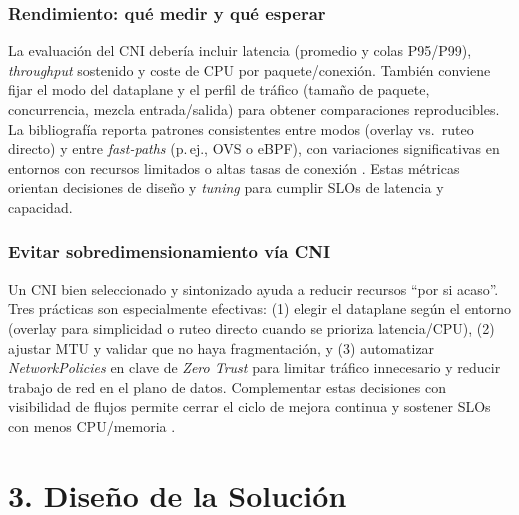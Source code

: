 \documentclass[journal]{IEEEtran}
\begin{document}
\subsubsection{Rendimiento: qué medir y qué esperar}
La evaluación del CNI debería incluir latencia (promedio y colas P95/P99), \emph{throughput} sostenido y coste de CPU por paquete/conexión. También conviene fijar el modo del dataplane y el perfil de tráfico (tamaño de paquete, concurrencia, mezcla entrada/salida) para obtener comparaciones reproducibles. La bibliografía reporta patrones consistentes entre modos (overlay vs.\ ruteo directo) y entre \emph{fast-paths} (p.\,ej., OVS o eBPF), con variaciones significativas en entornos con recursos limitados o altas tasas de conexión \cite{ref7,ref8,ref9,ref11,ref22,ref27}. Estas métricas orientan decisiones de diseño y \emph{tuning} para cumplir SLOs de latencia y capacidad.

\subsubsection{Evitar sobredimensionamiento vía CNI}
Un CNI bien seleccionado y sintonizado ayuda a reducir recursos “por si acaso”. Tres prácticas son especialmente efectivas: (1) elegir el dataplane según el entorno (overlay para simplicidad o ruteo directo cuando se prioriza latencia/CPU), (2) ajustar MTU y validar que no haya fragmentación, y (3) automatizar \emph{NetworkPolicies} en clave de \emph{Zero Trust} para limitar tráfico innecesario y reducir trabajo de red en el plano de datos. Complementar estas decisiones con visibilidad de flujos permite cerrar el ciclo de mejora continua y sostener SLOs con menos CPU/memoria \cite{ref7,ref8,ref12,ref23,ref24,ref25}.


% 


\section{3. Diseño de la Solución}
\end{document}
